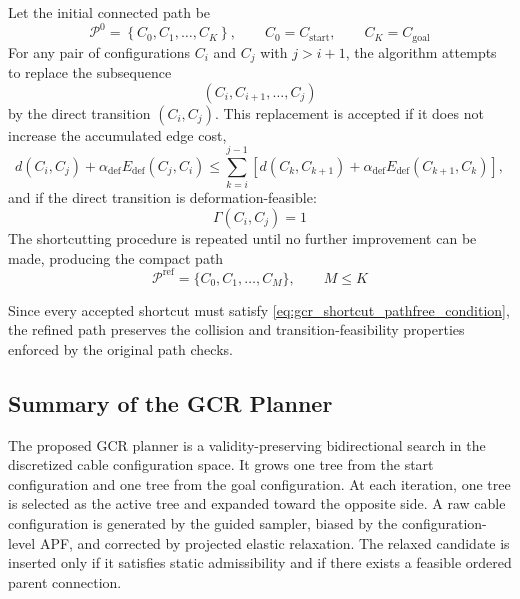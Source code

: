 \documentclass{pas}
\begin{document}
Let the initial connected path be
\begin{equation}
\mathcal{P}^{0}
=
\left\{
C_0,C_1,\ldots,C_K
\right\},
\qquad
C_0=C_{\mathrm{start}},
\qquad
C_K=C_{\mathrm{goal}}
\label{eq:gcr_initial_solution_path}
\end{equation}
For any pair of configurations $C_i$ and $C_j$ with $j>i+1$, the algorithm attempts to replace the subsequence
\begin{equation}
\left(
C_i,C_{i+1},\ldots,C_j
\right)
\label{eq:gcr_shortcut_subsequence}
\end{equation}
by the direct transition $(C_i,C_j)$. This replacement is accepted if it does not increase the accumulated edge cost,
\begin{equation}
d(C_i,C_j)
+
\alpha_{\mathrm{def}}E_{\mathrm{def}}(C_j,C_i)
\leq
\sum_{k=i}^{j-1}
\left[
d(C_k,C_{k+1})
+
\alpha_{\mathrm{def}}E_{\mathrm{def}}(C_{k+1},C_k)
\right],
\label{eq:gcr_shortcut_cost_condition}
\end{equation}
and if the direct transition is deformation-feasible:
\begin{equation}
\Gamma(C_i,C_j)=1
\label{eq:gcr_shortcut_pathfree_condition}
\end{equation}
The shortcutting procedure is repeated until no further improvement can be made, producing the compact path
\begin{equation}
    \mathcal{P}^{\mathrm{ref}}
=
\{C_0,C_1,\ldots,C_M\},
\qquad
M\leq K 
\label{eq:refinedpath}
\end{equation}

Since every accepted shortcut must satisfy \eqref{eq:gcr_shortcut_pathfree_condition}, the refined path preserves the collision and transition-feasibility properties enforced by the original path checks.


\subsection{Summary of the GCR Planner} 
\label{subsec:gcr_summary} 
The proposed GCR planner is a validity-preserving bidirectional search in the discretized cable configuration space. It grows one tree from the start configuration and one tree from the goal configuration. At each iteration, one tree is selected as the active tree and expanded toward the opposite side. A raw cable configuration is generated by the guided sampler, biased by the configuration-level APF, and corrected by projected elastic relaxation. The relaxed candidate is inserted only if it satisfies static admissibility and if there exists a feasible ordered parent connection.
\end{document}
